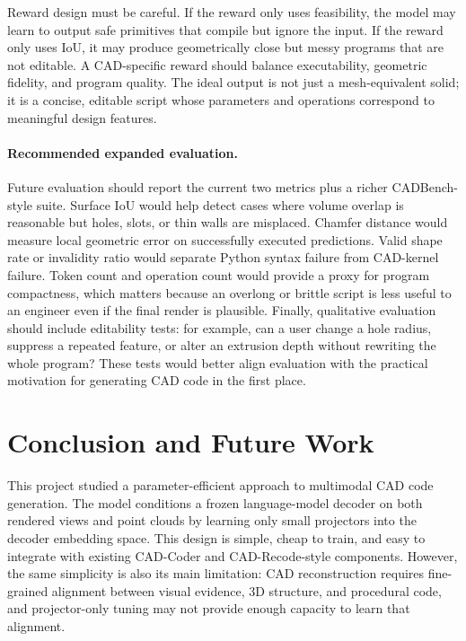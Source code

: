 \documentclass{article}
\begin{document}
Reward design must be careful. If the reward only uses feasibility, the model may learn to output safe primitives that compile but ignore the input. If the reward only uses IoU, it may produce geometrically close but messy programs that are not editable. A CAD-specific reward should balance executability, geometric fidelity, and program quality. The ideal output is not just a mesh-equivalent solid; it is a concise, editable script whose parameters and operations correspond to meaningful design features.

\paragraph{Recommended expanded evaluation.}
Future evaluation should report the current two metrics plus a richer CADBench-style suite. Surface IoU would help detect cases where volume overlap is reasonable but holes, slots, or thin walls are misplaced. Chamfer distance would measure local geometric error on successfully executed predictions. Valid shape rate or invalidity ratio would separate Python syntax failure from CAD-kernel failure. Token count and operation count would provide a proxy for program compactness, which matters because an overlong or brittle script is less useful to an engineer even if the final render is plausible. Finally, qualitative evaluation should include editability tests: for example, can a user change a hole radius, suppress a repeated feature, or alter an extrusion depth without rewriting the whole program? These tests would better align evaluation with the practical motivation for generating CAD code in the first place.

\section{Conclusion and Future Work}

This project studied a parameter-efficient approach to multimodal CAD code generation. The model conditions a frozen language-model decoder on both rendered views and point clouds by learning only small projectors into the decoder embedding space. This design is simple, cheap to train, and easy to integrate with existing CAD-Coder and CAD-Recode-style components. However, the same simplicity is also its main limitation: CAD reconstruction requires fine-grained alignment between visual evidence, 3D structure, and procedural code, and projector-only tuning may not provide enough capacity to learn that alignment.
\end{document}
